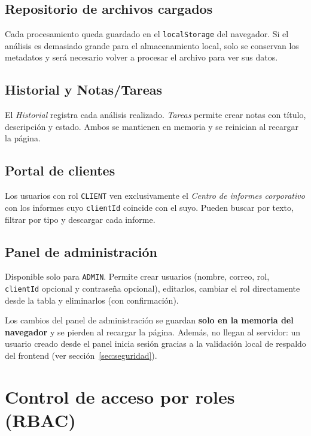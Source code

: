 \documentclass[11pt,a4paper]{article}
\begin{document}
\subsection{Repositorio de archivos cargados}
Cada procesamiento queda guardado en el \texttt{localStorage} del navegador. Si el
análisis es demasiado grande para el almacenamiento local, solo se conservan los
metadatos y será necesario volver a procesar el archivo para ver sus datos.

\subsection{Historial y Notas/Tareas}
El \emph{Historial} registra cada análisis realizado. \emph{Tareas} permite crear notas
con título, descripción y estado. Ambos se mantienen en memoria y se reinician al
recargar la página.

\subsection{Portal de clientes}
Los usuarios con rol \texttt{CLIENT} ven exclusivamente el \emph{Centro de informes
corporativo} con los informes cuyo \texttt{clientId} coincide con el suyo. Pueden buscar
por texto, filtrar por tipo y descargar cada informe.

\subsection{Panel de administración}
Disponible solo para \texttt{ADMIN}. Permite crear usuarios (nombre, correo, rol,
\texttt{clientId} opcional y contraseña opcional), editarlos, cambiar el rol directamente
desde la tabla y eliminarlos (con confirmación).

\begin{aviso}
Los cambios del panel de administración se guardan \textbf{solo en la memoria del
navegador} y se pierden al recargar la página. Además, no llegan al servidor: un usuario
creado desde el panel inicia sesión gracias a la validación local de respaldo del
frontend (ver sección~\ref{sec:seguridad}).
\end{aviso}

\section{Control de acceso por roles (RBAC)}\label{sec:rbac}
\end{document}
